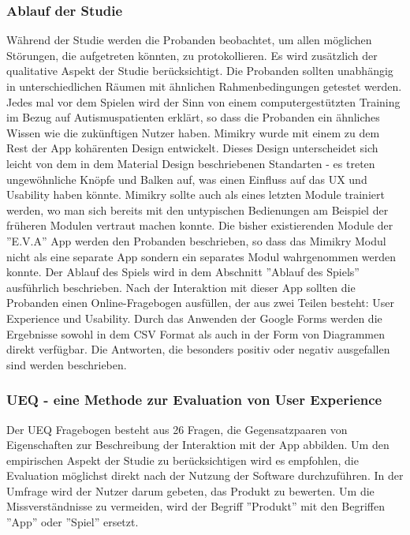 \subsubsection{Ablauf der Studie}
Während der Studie werden die Probanden beobachtet, um allen möglichen Störungen, die aufgetreten könnten, zu protokollieren. Es wird zusätzlich der qualitative Aspekt der Studie berücksichtigt. Die Probanden sollten unabhängig in unterschiedlichen Räumen mit ähnlichen Rahmenbedingungen getestet werden. 
Jedes mal vor dem Spielen wird der Sinn von einem computergestützten Training im Bezug auf Autismuspatienten erklärt, so dass die Probanden ein ähnliches Wissen wie die zukünftigen Nutzer haben. 
Mimikry wurde mit einem zu dem Rest der App kohärenten Design entwickelt. Dieses Design unterscheidet sich leicht von dem in dem Material Design beschriebenen Standarten - es treten ungewöhnliche Knöpfe und Balken auf, was einen Einfluss auf das UX und Usability haben könnte. Mimikry sollte auch als eines letzten Module trainiert werden, wo man sich bereits mit den untypischen Bedienungen am Beispiel der früheren Modulen vertraut machen konnte. Die bisher existierenden Module der ''E.V.A'' App werden den Probanden beschrieben, so dass das Mimikry Modul nicht als eine separate App sondern ein separates Modul wahrgenommen werden konnte. 
Der Ablauf des Spiels wird in dem Abschnitt ''Ablauf des Spiels'' ausführlich beschrieben.
Nach der Interaktion mit dieser App sollten die Probanden einen Online-Fragebogen ausfüllen, der aus zwei Teilen besteht: User Experience und Usability. Durch das Anwenden der Google Forms werden die Ergebnisse sowohl in dem CSV Format als auch in der Form von Diagrammen direkt verfügbar. 
Die Antworten, die besonders positiv oder negativ ausgefallen sind werden beschrieben.

\subsubsection{UEQ - eine Methode zur Evaluation von User Experience}
Der UEQ Fragebogen besteht aus 26 Fragen, die Gegensatzpaaren von Eigenschaften zur Beschreibung der Interaktion mit der App abbilden. Um den empirischen Aspekt der Studie zu berücksichtigen wird es empfohlen, die Evaluation möglichst direkt nach der Nutzung der Software durchzuführen.
In der Umfrage wird der Nutzer darum gebeten, das Produkt zu bewerten. Um die Missverständnisse zu vermeiden, wird der Begriff ''Produkt'' mit den Begriffen ''App'' oder ''Spiel'' ersetzt.

